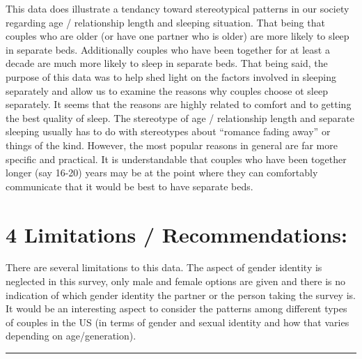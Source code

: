 \documentclass[
]{article}
\begin{document}
This data does illustrate a tendancy toward stereotypical patterns in
our society regarding age / relationship length and sleeping situation.
That being that couples who are older (or have one partner who is older)
are more likely to sleep in separate beds. Additionally couples who have
been together for at least a decade are much more likely to sleep in
separate beds. That being said, the purpose of this data was to help
shed light on the factors involved in sleeping separately and allow us
to examine the reasons why couples choose ot sleep separately. It seems
that the reasons are highly related to comfort and to getting the best
quality of sleep. The stereotype of age / relationship length and
separate sleeping usually has to do with stereotypes about ``romance
fading away'' or things of the kind. However, the most popular reasons
in general are far more specific and practical. It is understandable
that couples who have been together longer (say 16-20) years may be at
the point where they can comfortably communicate that it would be best
to have separate beds.

\hypertarget{limitations-recommendations}{%
\section{4 Limitations /
Recommendations:}\label{limitations-recommendations}}

There are several limitations to this data. The aspect of gender
identity is neglected in this survey, only male and female options are
given and there is no indication of which gender identity the partner or
the person taking the survey is. It would be an interesting aspect to
consider the patterns among different types of couples in the US (in
terms of gender and sexual identity and how that varies depending on
age/generation).

\begin{center}\rule{0.5\linewidth}{0.5pt}\end{center}
\end{document}
